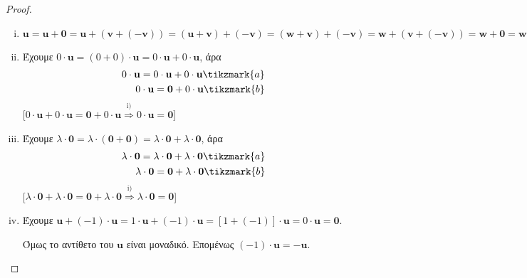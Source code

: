 \begin{proof}
\item {}
    \begin{enumerate}[i)]
        \item $ \mathbf{u} = \mathbf{u} + \mathbf{0} = \mathbf{u} + 
            (\mathbf{v} + (- \mathbf{v})) = (\mathbf{u} + \mathbf{v}) + 
            (- \mathbf{v}) = (\mathbf{w} + \mathbf{v}) + (- \mathbf{v}) = \mathbf{w} + 
            (\mathbf{v} + (- \mathbf{v})) = \mathbf{w} + \mathbf{0} = \mathbf{w}$
        \item Έχουμε $ 0\cdot \mathbf{u} = (0 + 0) 
            \cdot \mathbf{u}= 0\cdot \mathbf{u}+ 0\cdot \mathbf{u} $, άρα
            \begin{align*}
                0\cdot \mathbf{u} = 0\cdot \mathbf{u} + 0\cdot
                \mathbf{u}\tikzmark{a} \\
                0\cdot \mathbf{u} = \mathbf{0} + 0\cdot \mathbf{u} 
                \tikzmark{b}
            \end{align*} 
            [$ 0\cdot \mathbf{u} + 0\cdot \mathbf{u} = 
            \mathbf{0}+ 0\cdot \mathbf{u} \overset{\text{i)}}{\Rightarrow}  
            0\cdot \mathbf{u} = \mathbf{0}$]
        \item Έχουμε $ \lambda \cdot \mathbf{0} = \lambda \cdot 
            (\mathbf{0} + \mathbf{0}) = \lambda \cdot \mathbf{0} + \lambda 
            \cdot \mathbf{0}$, άρα 
            \begin{align*}
                \lambda \cdot \mathbf{0} = \lambda \cdot \mathbf{0} + \lambda \cdot 
                \mathbf{0} \tikzmark{a} \\
                \lambda \cdot \mathbf{0} = \mathbf{0} + \lambda \cdot \mathbf{0}
                \tikzmark{b}
            \end{align*}
            [$ \lambda \cdot \mathbf{0}+ \lambda \cdot \mathbf{0} = 
            \mathbf{0} + \lambda \cdot \mathbf{0} \overset{\text{i)}}{\Rightarrow}  
            \lambda \cdot \mathbf{0} = \mathbf{0}$]
        \item Έχουμε $ \mathbf{u} + (-1)\cdot \mathbf{u} = 1\cdot 
            \mathbf{u} + (-1)\cdot \mathbf{u} = [1+(-1)] \cdot \mathbf{u}= 0 
            \cdot \mathbf{u} = \mathbf{0} $. 

            Όμως το αντίθετο του $ \mathbf{u} $ είναι μοναδικό. Επομένως 
            $ (-1)\cdot \mathbf{u} = - \mathbf{u}$.


\end{enumerate}
\end{proof}
